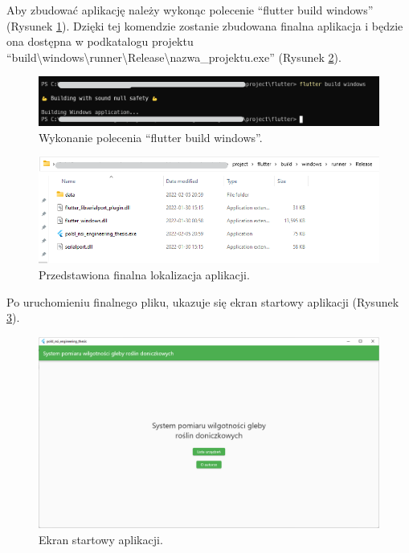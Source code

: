 \documentclass[a4paper,twoside,12pt]{book}
\begin{document}
Aby zbudować aplikację należy wykonąc polecenie ``flutter build windows'' (Rysunek \ref{fig:11}). Dzięki tej komendzie zostanie zbudowana finalna aplikacja i będzie ona dostępna w podkatalogu projektu ``build\textbackslash windows\textbackslash runner\textbackslash Release\textbackslash nazwa\_projektu.exe'' (Rysunek \ref{fig:12}).

\begin{figure}[H]
   \centering
   \includegraphics[width=\textwidth]{./assets/img/img011.png}
   \caption{Wykonanie polecenia ``flutter build windows''.}
   \label{fig:11}
\end{figure}

\begin{figure}[H]
   \centering
   \includegraphics[width=\textwidth]{./assets/img/img012.png}
   \caption{Przedstawiona finalna lokalizacja aplikacji.}
   \label{fig:12}
\end{figure}

Po uruchomieniu finalnego pliku, ukazuje się ekran startowy aplikacji (Rysunek \ref{fig:13}).

\begin{figure}[H]
   \centering
   \includegraphics[width=\textwidth]{./assets/img/img013.png}
   \caption{Ekran startowy aplikacji.}
   \label{fig:13}
\end{figure}
\end{document}
